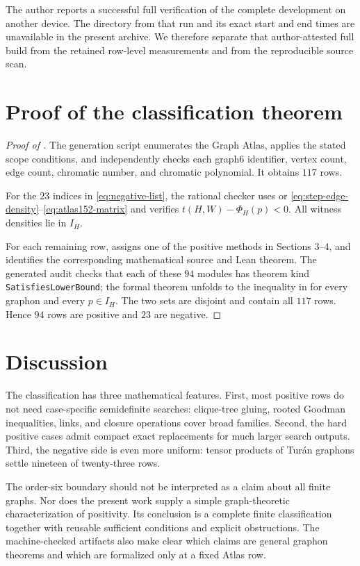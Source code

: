 \documentclass[11pt]{article}
\numberwithin{equation}{section}
\theoremstyle{definition}
\theoremstyle{remark}
\begin{document}
The author reports a successful full verification of the complete
development on another device.  The directory from that run and its exact
start and end times are unavailable in the present archive.  We therefore
separate that author-attested full build from the retained row-level
measurements and from the reproducible source scan.

\section{Proof of the classification theorem}

\begin{proof}[Proof of ]
The generation script enumerates the Graph Atlas, applies the stated scope
conditions, and independently checks each graph6 identifier, vertex count,
edge count, chromatic number, and chromatic polynomial.  It obtains $117$
rows.

For the $23$ indices in \eqref{eq:negative-list}, the rational checker uses
 or
\eqref{eq:step-edge-density}--\eqref{eq:atlas152-matrix} and verifies
$t(H,W)-\Phi_H(p)<0$.  All witness densities lie in $I_H$.

For each remaining row,  assigns one of the
positive methods in Sections 3--4, and  identifies the
corresponding mathematical source and Lean theorem.  The generated audit
checks that each of these $94$ modules has theorem kind
\texttt{SatisfiesLowerBound}; the formal theorem unfolds to the inequality in
 for every graphon and every $p\in I_H$.  The two sets are
disjoint and contain all $117$ rows.  Hence $94$ rows are positive and $23$
are negative.
\end{proof}

\section{Discussion}

The classification has three mathematical features.  First, most positive
rows do not need case-specific semidefinite searches: clique-tree gluing,
rooted Goodman inequalities, links, and closure operations cover broad
families.  Second, the hard positive cases admit compact exact replacements
for much larger search outputs.  Third, the negative side is even more
uniform: tensor products of Tur\'{a}n graphons settle nineteen of twenty-three
rows.

The order-six boundary should not be interpreted as a claim about all finite
graphs.  Nor does the present work supply a simple graph-theoretic
characterization of positivity.  Its conclusion is a complete finite
classification together with reusable sufficient conditions and explicit
obstructions.  The machine-checked artifacts also make clear which claims are
general graphon theorems and which are formalized only at a fixed Atlas row.
\end{document}
